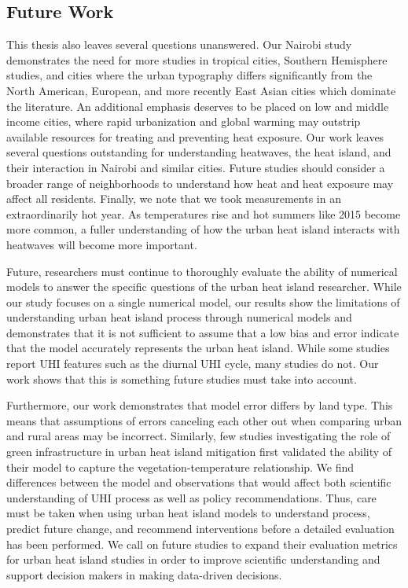 \subsection{Future Work}
This thesis also leaves several questions unanswered. 
Our Nairobi study demonstrates the need for more studies in tropical cities, Southern Hemisphere studies, and cities where the urban typography differs significantly from the North American, European, and more recently East Asian cities which dominate the literature. An additional emphasis deserves to be placed on low and middle income cities, where rapid urbanization and global warming may outstrip available resources for treating and preventing heat exposure. 
Our work leaves several questions outstanding for understanding  heatwaves, the heat island, and their interaction in Nairobi and similar cities. Future studies should consider a broader range of neighborhoods to understand how heat and heat exposure may affect all residents. Finally, we note that we took measurements in an extraordinarily hot year. As temperatures rise and hot summers like 2015 become more common, a fuller understanding of how the urban heat island interacts with heatwaves will become more important. 

Future, researchers must continue to thoroughly evaluate the ability of numerical models to answer the specific questions of the urban heat island researcher.  
While our study focuses on a single numerical model, our results show the limitations of understanding urban heat island process through numerical models and demonstrates that it is not sufficient to assume that a low bias and error indicate that the model accurately represents the urban heat island.  While some studies report UHI features such as the diurnal UHI cycle, many studies do not. Our work shows that this is something future studies must take into account. 

Furthermore, our work demonstrates that model error differs by land type. 
This means that assumptions of errors canceling each other out when comparing urban and rural areas may be incorrect. Similarly, few studies investigating the role of green infrastructure in urban heat island mitigation first validated the ability of their model to capture the vegetation-temperature relationship. We find differences between the model and observations that would affect both scientific understanding of UHI process as well as policy recommendations. 
Thus, care must be taken when using urban heat island models to understand process, predict future change, and recommend interventions before a detailed evaluation has been performed. We call on future studies to expand their evaluation metrics for urban heat island studies in order to improve scientific understanding and support decision makers in making data-driven decisions. 

